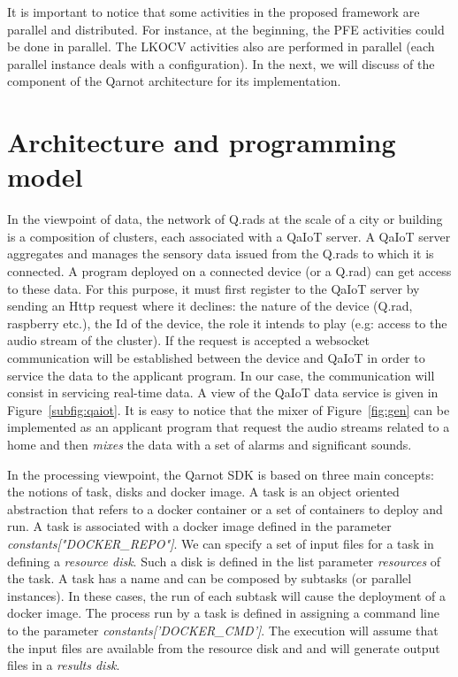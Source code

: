 \documentclass[10pt, conference, compsocconf]{IEEEtran}
\begin{document}
It is important to notice that some activities in the proposed framework are parallel and distributed. For instance, at the beginning, 
the PFE activities could be done in parallel. The LKOCV activities also are performed in parallel (each parallel instance deals  
with a configuration). In the next, we will discuss of the component of the Qarnot architecture for 
its implementation.

\section{Architecture and programming model} \label{Model}

In the viewpoint of data, the network of Q.rads at the scale of a city or building is a composition of clusters, each 
associated with a QaIoT server. A QaIoT server aggregates and manages the sensory data issued from the Q.rads to which it is 
connected. A program deployed on a connected device (or a Q.rad) can get access to these data. For this purpose, 
it must first register to the QaIoT server by sending an Http request where it declines: the nature of the device (Q.rad, 
raspberry etc.), the Id of the device, the role it intends to play (e.g: access to the audio stream of the cluster). If the 
request is accepted a websocket communication will be established between the device and QaIoT in order to service the data
to the applicant program. In our case, the communication will consist in servicing real-time data.
A view of the QaIoT data service is given in Figure~\ref{subfig:qaiot}. 
It is easy to notice that the mixer of Figure~\ref{fig:gen} can be implemented as an applicant program that request the audio streams  
related to a home and then {\it mixes} the data with a set of alarms and significant sounds.

In the processing viewpoint, the Qarnot SDK is based on three main concepts: the notions of task, 
disks and docker image. A task is an object oriented abstraction that refers to a 
docker container or a set of containers to deploy and run. A task is associated with a docker image defined in the 
parameter {\it constants["DOCKER\_REPO"]}. We can specify a set of input files for a task in defining a {\it resource disk}. 
Such a disk is defined in the list parameter {\it resources} of the task. 
A task has a name and can be composed by subtasks (or parallel instances).  
In these cases, the run of each subtask will cause the deployment of a docker image. The process run by a task is defined in 
assigning a command line to the parameter {\it constants['DOCKER\_CMD']}. The execution will assume that the input 
files are available from the resource disk and and will generate output files in a {\it results disk}.
\end{document}
